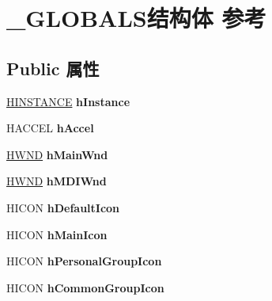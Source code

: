 \hypertarget{struct___g_l_o_b_a_l_s}{}\section{\+\_\+\+G\+L\+O\+B\+A\+L\+S结构体 参考}
\label{struct___g_l_o_b_a_l_s}
\subsection*{Public 属性}
\begin{DoxyCompactItemize}
\item 
\mbox{\label{struct___g_l_o_b_a_l_s_a1c9dd5e07ff1e0dc8fb64d943f438609}} 
\hyperlink{interfacevoid}{H\+I\+N\+S\+T\+A\+N\+CE} {\bfseries h\+Instance}
\item 
\mbox{\label{struct___g_l_o_b_a_l_s_a940cfdbd085fbb1d9a24f608bde60cfb}} 
H\+A\+C\+C\+EL {\bfseries h\+Accel}
\item 
\mbox{\label{struct___g_l_o_b_a_l_s_ae312f2c88174fbca88f8913d24c0d5b9}} 
\hyperlink{interfacevoid}{H\+W\+ND} {\bfseries h\+Main\+Wnd}
\item 
\mbox{\label{struct___g_l_o_b_a_l_s_a5368bb05eb0b1d107a312a00531bf71d}} 
\hyperlink{interfacevoid}{H\+W\+ND} {\bfseries h\+M\+D\+I\+Wnd}
\item 
\mbox{\label{struct___g_l_o_b_a_l_s_a6049c77e28fbfc7333450c808344c33c}} 
H\+I\+C\+ON {\bfseries h\+Default\+Icon}
\item 
\mbox{\label{struct___g_l_o_b_a_l_s_ad029a8a7dacf9559297e14a48fc3e9aa}} 
H\+I\+C\+ON {\bfseries h\+Main\+Icon}
\item 
\mbox{\label{struct___g_l_o_b_a_l_s_a7d1c50cbb3db28ce8c9bf15930bca226}} 
H\+I\+C\+ON {\bfseries h\+Personal\+Group\+Icon}
\item 
\mbox{\label{struct___g_l_o_b_a_l_s_a694162e371180a7c173fc3cfd33e4a34}} 
H\+I\+C\+ON {\bfseries h\+Common\+Group\+Icon}
\item 
\mbox{\label{struct___g_l_o_b_a_l_s_a28f8e24c9040ec91a11a4afaac39363d}} 

\end{DoxyCompactItemize}
